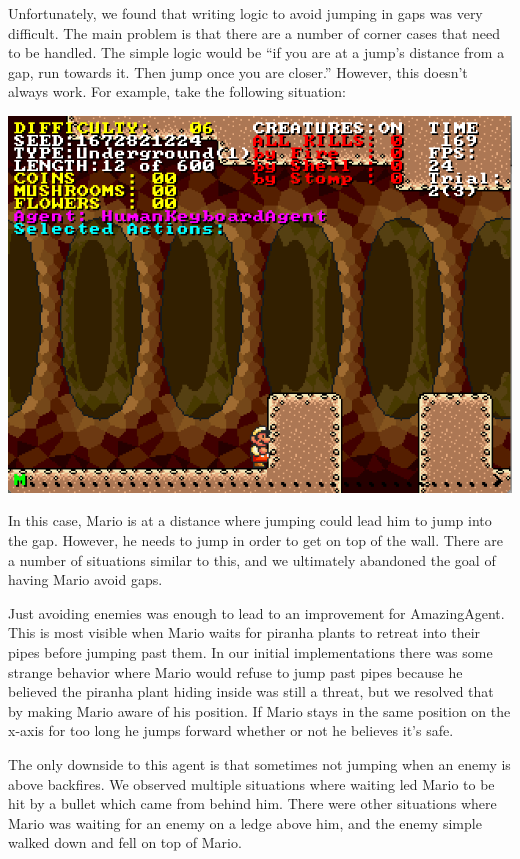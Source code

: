 \documentclass[12pt]{article}
\begin{document}
\begin{multicols*}{2}
Unfortunately, we found that writing logic to avoid jumping in gaps was very difficult.  The main 
problem is that there are a number of corner cases that need to be handled.  The simple logic would 
be ``if you are at a jump's distance from a gap, run towards it.  Then jump once you are closer.''  
However, this doesn't always work.  For example, take the following situation:
\begin{center}
\includegraphics[scale=0.6]{gap_issue}
\end{center}
In this case, Mario is at a distance where jumping could lead him to jump into the gap.  However, 
he needs to jump in order to get on top of the wall.  There are a number of situations similar to 
this, and we ultimately abandoned the goal of having Mario avoid gaps.

Just avoiding enemies was enough to lead to an improvement for AmazingAgent.  This is most 
visible when Mario waits for piranha plants to retreat into their pipes before jumping past them.  
In our initial implementations there was some strange behavior 
where Mario would refuse to jump past pipes because he believed 
the piranha plant hiding inside was still a threat, 
but we resolved that by making Mario aware of his position.  If 
Mario stays in the same position on the x-axis for too long he jumps forward whether or not he believes 
it's safe.

The only downside to this agent is that sometimes not jumping when an enemy is above backfires.  
We observed multiple situations where waiting led Mario to be hit by a bullet which came from behind 
him.  There were other situations where Mario was waiting for an enemy on a ledge above him, and 
the enemy simple walked down and fell on top of Mario.


\end{multicols*}
\end{document}
